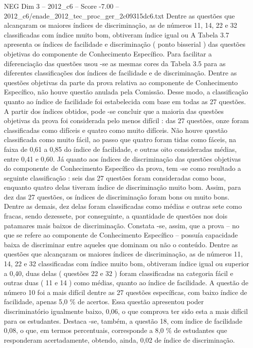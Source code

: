 \begin{textsample}{NEG Dim 3 – 2012\_c6 – Score -7.00 – 2012\_c6/enade\_2012\_tec\_proc\_ger\_2c09315dc6.txt}
Dentre as questões que alcançaram os maiores índices de discriminação, as de números 11, 14, 22 e 32 classificadas com índice muito bom, obtiveram índice igual ou A Tabela 3.7 apresenta os índices de facilidade e discriminação ( ponto bisserial ) das questões objetivas do componente de Conhecimento Específico.
Para facilitar a diferenciação das questões usou -se as mesmas cores da Tabela 3.5 para as diferentes classificações dos índices de facilidade e de discriminação.
Dentre as questões objetivas da parte da prova relativa ao componente de Conhecimento Específico, não houve questão anulada pela Comissão.
Desse modo, a classificação quanto ao índice de facilidade foi estabelecida com base em todas as 27 questões.
A partir dos índices obtidos, pode -se concluir que a maioria das questões objetivas da prova foi considerada pelo menos difícil : das 27 questões, onze foram classificadas como difíceis e quatro como muito difíceis.
Não houve questão classificada como muito fácil, ao passo que quatro foram tidas como fáceis, na faixa de 0,61 a 0,85 do índice de facilidade, e outras oito consideradas médias, entre 0,41 e 0,60.
Já quanto aos índices de discriminação das questões objetivas do componente de Conhecimento Específico da prova, tem -se como resultado a seguinte classificação : seis das 27 questões foram consideradas como boas, enquanto quatro delas tiveram índice de discriminação muito bom.
Assim, para dez das 27 questões, os índices de discriminação foram bons ou muito bons.
Dentre as demais, dez delas foram classificadas como médias e outras sete como fracas, sendo dezessete, por conseguinte, a quantidade de questões nos dois patamares mais baixos de discriminação.
Constata -se, assim, que a prova – no que se refere ao componente de Conhecimento Específico – possuía capacidade baixa de discriminar entre aqueles que dominam ou não o conteúdo.
Dentre as questões que alcançaram os maiores índices de discriminação, as de números 11, 14, 22 e 32 classificadas com índice muito bom, obtiveram índice igual ou superior a 0,40, duas delas ( questões 22 e 32 ) foram classificadas na categoria fácil e outras duas ( 11 e 14 ) como médias, quanto ao índice de facilidade.
A questão de número 10 foi a mais difícil dentre as 27 questões específicas, com baixo índice de facilidade, apenas 5,0 \% de acertos.
Essa questão apresentou poder discriminatório igualmente baixo, 0,06, o que comprova ter sido esta a mais difícil para os estudantes.
Destaca -se, também, a questão 18, com índice de facilidade 0,08, o que, em termos percentuais, corresponde a 8,0 \% de estudantes que responderam acertadamente, obtendo, ainda, 0,02 de índice de discriminação.

\end{textsample}
